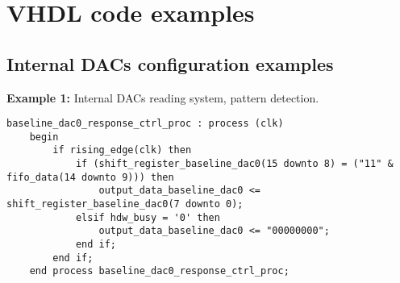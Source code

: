 \chapter{VHDL code examples}\label{codeexamples}
\section{Internal DACs configuration examples}
\noindent \textbf{Example 1:} Internal DACs reading system, pattern detection. 
\begin{lstlisting}[style=vhdl]	
	baseline_dac0_response_ctrl_proc : process (clk)
	begin
		if rising_edge(clk) then 
			if (shift_register_baseline_dac0(15 downto 8) = ("11" & fifo_data(14 downto 9))) then
				output_data_baseline_dac0 <= shift_register_baseline_dac0(7 downto 0);
			elsif hdw_busy = '0' then	
				output_data_baseline_dac0 <= "00000000";
			end if;
		end if;
	end process baseline_dac0_response_ctrl_proc;
\end{lstlisting}
